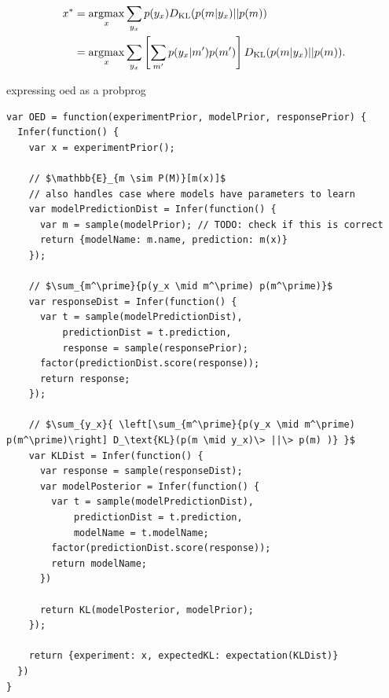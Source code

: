\documentclass{article}
\newcommand{\cas}[1]{ \textsf{\color{darkgray} \scriptsize #1} }
\newcommand{\argmax}{\operatornamewithlimits{argmax}}
\begin{document}
\begin{align}
x^{*} &= \argmax_{x} \sum\limits_{y_x} p(y_x) D_{\text{KL}}(p(m|y_x) || p(m)) \notag \\
    &= \argmax_{x} \sum\limits_{y_x} \left[\sum\limits_{m'} p(y_x|m')p(m')\right] D_{\text{KL}}(p(m|y_x) || p(m)). \label{eq:oed}
\end{align}

\cas{expressing oed as a probprog}

\begin{lstlisting}[mathescape=true]
var OED = function(experimentPrior, modelPrior, responsePrior) {
  Infer(function() {
    var x = experimentPrior();

    // $\mathbb{E}_{m \sim P(M)}[m(x)]$
    // also handles case where models have parameters to learn
    var modelPredictionDist = Infer(function() {
      var m = sample(modelPrior); // TODO: check if this is correct
      return {modelName: m.name, prediction: m(x)}
    });

    // $\sum_{m^\prime}{p(y_x \mid m^\prime) p(m^\prime)}$
    var responseDist = Infer(function() {
      var t = sample(modelPredictionDist),
          predictionDist = t.prediction,
          response = sample(responsePrior);
      factor(predictionDist.score(response));
      return response;
    });

    // $\sum_{y_x}{ \left[\sum_{m^\prime}{p(y_x \mid m^\prime) p(m^\prime)\right] D_\text{KL}(p(m \mid y_x)\> ||\> p(m) )} }$
    var KLDist = Infer(function() {
      var response = sample(responseDist);
      var modelPosterior = Infer(function() {
        var t = sample(modelPredictionDist),
            predictionDist = t.prediction,
            modelName = t.modelName;
        factor(predictionDist.score(response));
        return modelName;
      })

      return KL(modelPosterior, modelPrior);
    });

    return {experiment: x, expectedKL: expectation(KLDist)}
  })
}
\end{lstlisting}
\end{document}
